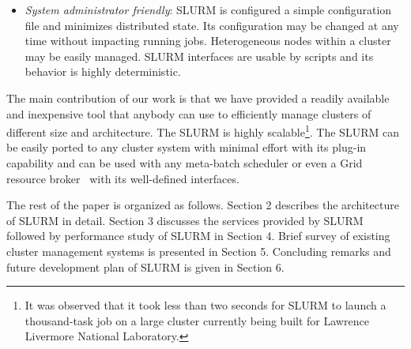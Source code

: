 \begin{itemize}
\item {\em System administrator friendly}: SLURM is configured a 
simple configuration file and minimizes distributed state.  
Its configuration may be changed at any time without impacting running jobs. 
Heterogeneous nodes within a cluster may be easily managed.
SLURM interfaces are usable by scripts and its behavior is highly 
deterministic.

\end{itemize}

The main contribution of our work is that we have provided a readily available 
and inexpensive tool that anybody can use to efficiently manage clusters of different size and architecture. 
The SLURM is highly scalable\footnote{It was observed that it took less than two seconds for SLURM to launch a thousand-task job on 
a large cluster currently being built for Lawrence Livermore National Laboratory.}. 
The SLURM can be easily ported to any cluster system with minimal effort with its plug-in 
capability and can be used with any meta-batch scheduler or even a Grid resource broker~\cite{Gridbook}
with its well-defined interfaces.

The rest of the paper is organized as follows. 
Section 2 describes the architecture of SLURM in detail. Section 3 discusses the services provided by SLURM followed by performance study of 
SLURM in Section 4. Brief survey of existing cluster management systems is presented in Section 5. 
Concluding remarks and future development plan of SLURM is given in Section 6.
